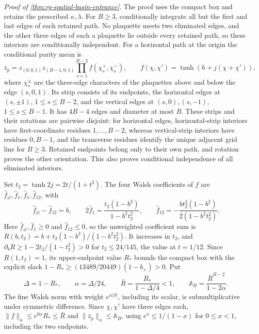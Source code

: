 \noindent\emph{Proof of \cref{thm:rg-spatial-basin-entrance}.}
The proof uses the compact box and retains the prescribed \(\kappa,\lambda\).
For \(B\ge3\), conditionally integrate all but the first and last edges of
each retained path. No plaquette meets two eliminated edges, and the other
three edges of such a plaquette lie outside every retained path, so these
interiors are conditionally independent. For a horizontal path at the
origin the conditional parity mean is
\begin{equation}
 \bar z_p=z_{(0,0,1)}z_{(B-1,0,1)}
        \prod_{s=1}^{B-2}f(\chi^+_s,\chi^-_s),\qquad
 f(\chi,\chi')=\tanh(h+j(\chi+\chi')),
 \label{eq:rg-spatial-proof-basin-strip}
\end{equation}
where \(\chi^\pm_s\) are the three-edge characters of the plaquettes above
and below the edge \((s,0,1)\). Its strip consists of its endpoints, the
horizontal edges at \((s,\pm1)\), \(1\le s\le B-2\), and the vertical edges
at \((s,0),(s,-1)\), \(1\le s\le B-1\). It has \(4B-4\) edges and diameter
at most \(B\). These strips and their rotations are pairwise disjoint: for
horizontal edges, horizontal-strip interiors have first-coordinate residues
\(1,\ldots,B-2\), whereas vertical-strip interiors have residues \(0,B-1\),
and the transverse residues identify the unique adjacent grid line for
\(B\ge3\). Retained endpoints belong only to their own path, and rotation
proves the other orientation. This also proves conditional independence of
all eliminated interiors.

Set \(t_2=\tanh2j=2t/(1+t^2)\). The four Walsh coefficients of \(f\) are
\(\hat f_\varnothing,\hat f_1,\hat f_1,\hat f_{12}\), with
\begin{equation}
 \hat f_\varnothing-\hat f_{12}=b,\qquad
 2\hat f_1=\frac{t_2(1-b^2)}{1-b^2t_2^2},\qquad
 \hat f_{12}=-\frac{bt_2^2(1-b^2)}{2(1-b^2t_2^2)}.
 \label{eq:rg-spatial-proof-strip-coefficients}
\end{equation}
Here \(\hat f_\varnothing,\hat f_1\ge0\) and \(\hat f_{12}\le0\), so the
unweighted coefficient sum is \(R(b,t_2)=b+t_2(1-b^2)/(1-b^2t_2^2)\). It
increases in \(t_2\), and \(\partial_bR\ge1-2t_2/(1-t_2^2)>0\) for
\(t_2\le24/145\), the value at \(t=1/12\). Since \(R(1,t_2)=1\), its
upper-endpoint value \(R_*\) bounds the compact box with the explicit slack
\(1-R_*\ge(13489/20449)(1-b_+)>0\). Put
\begin{equation}
 \Delta=1-R_*,\qquad \alpha=\Delta/24,\qquad
 \bar R=\frac{R_*}{1-\Delta/4}<1,\qquad
 \mathbb A_B=\frac{\bar R^{B-2}}{1-2\alpha}.
 \label{eq:rg-spatial-proof-basin-activity}
\end{equation}
The fine Walsh norm with weight \(e^{\alpha|S|}\), including its scalar, is
submultiplicative under symmetric difference. Since \(\chi,\chi'\) have
three edges each, \(\|f\|_\alpha\le e^{6\alpha}R_*\le\bar R\) and
\(\|\bar z_p\|_\alpha\le\mathbb A_B\), using \(e^x\le1/(1-x)\) for
\(0\le x<1\), including the two endpoints.


